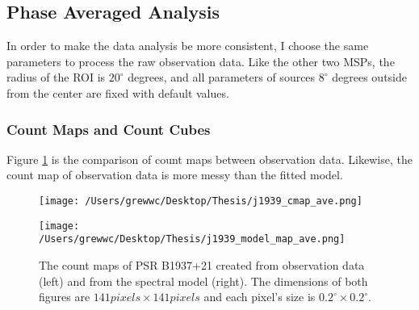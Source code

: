 \documentclass[12pt]{report}
\begin{document}
          \subsection{Phase Averaged Analysis}
            In order to make the data analysis be more consistent, I choose the same parameters
            to process the raw observation data. Like the other two MSPs, the radius of the ROI 
            is $20^{\circ}$ degrees, and all parameters of sources $8^{\circ}$ degrees outside 
            from the center are fixed with default values. 
            \subsubsection{Count Maps and Count Cubes}
              Figure \ref{fig: j1939_count_map_ave} is the comparison of count maps between 
              observation data. Likewise, the count map of observation data is more messy than 
              the fitted model. 

              \begin{figure}[!ht]
                \begin{center}
                \begin{minipage}{0.45\textwidth}
                  \begin{center} 
                    \texttt{[image: /Users/grewwc/Desktop/Thesis/j1939\_cmap\_ave.png]}
                  \end{center}
                \end{minipage}
                \begin{minipage}{0.45\textwidth}
                  \begin{center}
                    \texttt{[image: /Users/grewwc/Desktop/Thesis/j1939\_model\_map\_ave.png]}
                  \end{center}
                \end{minipage}
              \end{center}
              \caption{The count maps of PSR B1937+21 created from observation 
                  data (\textsf{left}) and from the spectral model (\textsf{right}). The dimensions
                  of both figures are $141 pixels \times 141 pixels$ and each pixel's size is
                  $0.2^{\circ}\times0.2^{\circ}$.}
                \label{fig: j1939_count_map_ave}
              \end{figure}
\end{document}

